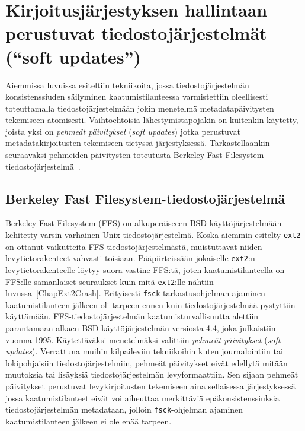 \section{Kirjoitusjärjestyksen hallintaan perustuvat tiedostojärjestelmät (``soft updates'')}
\label{ChapSoftUpdates}
Aiemmissa luvuissa esiteltiin tekniikoita,
jossa tiedostojärjestelmän konsistenssiuden säilyminen kaatumistilanteessa varmistettiin oleellisesti toteuttamalla tiedostojärjestelmään jokin menetelmä metadatapäivitysten tekemiseen atomisesti.
Vaihtoehtoisia lähestymistapojakin on kuitenkin käytetty,
joista yksi on \emph{pehmeät päivitykset} (\emph{soft updates}) jotka perustuvat metadatakirjoitusten tekemiseen tietyssä järjestyksessä.
Tarkastellaankin seuraavaksi pehmeiden päivitysten toteutusta Berkeley Fast Filesystem-tiedostojärjestelmä~\cite{SoftUpdatesFfs}.

\subsection{Berkeley Fast Filesystem-tiedostojärjestelmä}
Berkeley Fast Filesystem (FFS) on alkuperäiseeen BSD-käyttöjärjestelmään kehitetty varsin varhainen Unix-tiedostojärjestelmä.
Koska aiemmin esitelty \texttt{ext2} on ottanut vaikutteita FFS-tiedostojärjestelmästä,
muistuttavat niiden levytietorakenteet vahvasti toisiaan.
Pääpiirteissään jokaiselle \texttt{ext2}:n levytietorakenteelle löytyy suora vastine FFS:tä,
joten kaatumistilanteella on FFS:lle samanlaiset seuraukset kuin mitä \texttt{ext2}:lle nähtiin luvussa~\ref{ChapExt2Crash}.
Erityisesti \texttt{fsck}-tarkastusohjelman ajaminen kaatumistilanteen jälkeen oli tarpeen ennen kuin tiedostojärjestelmää pystyttiin käyttämään.
FFS-tiedostojärjestelmän kaatumisturvallisuutta alettiin parantamaan alkaen BSD-käyttöjärjestelmän versiosta 4.4, joka julkaistiin vuonna 1995.
Käytettäväksi menetelmäksi valittiin \emph{pehmeät päivitykset} (\emph{soft updates}).
Verrattuna muihin kilpaileviin tekniikoihin kuten journalointiin tai lokipohjaisiin tiedostojärjestelmiin,
pehmeät päivitykset eivät edellytä mitään muutoksia tai lisäyksiä tiedostojärjestelmän levyformaattiin.
Sen sijaan pehmeät päivitykset perustuvat levykirjoitusten tekemiseen aina sellaisessa järjestyksessä jossa kaatumistilanteet eivät voi aiheuttaa merkittäviä epäkonsistenssiuksia tiedostojärjestelmän metadataan,
jolloin \texttt{fsck}-ohjelman ajaminen kaatumistilanteen jälkeen ei ole enää tarpeen.

